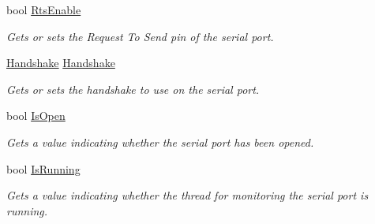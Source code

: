\begin{DoxyCompactItemize}
bool \mbox{\hyperlink{class_r_j_c_p_1_1_i_o_1_1_ports_1_1_native_1_1_win_native_serial_a29a44c81c9193aa7687178a2219cbed1}{Rts\+Enable}}
\begin{DoxyCompactList}\small\item\em Gets or sets the Request To Send pin of the serial port. \end{DoxyCompactList}\item 
\mbox{\hyperlink{namespace_r_j_c_p_1_1_i_o_1_1_ports_a5328e888558ed5726b3fb7b8b692527c}{Handshake}} \mbox{\hyperlink{class_r_j_c_p_1_1_i_o_1_1_ports_1_1_native_1_1_win_native_serial_abdd9c9b2d62c5ef94b975adfdd961dab}{Handshake}}
\begin{DoxyCompactList}\small\item\em Gets or sets the handshake to use on the serial port. \end{DoxyCompactList}\item 
bool \mbox{\hyperlink{class_r_j_c_p_1_1_i_o_1_1_ports_1_1_native_1_1_win_native_serial_a4dfb0aaa0ac8a6591d682133bff22a37}{Is\+Open}}
\begin{DoxyCompactList}\small\item\em Gets a value indicating whether the serial port has been opened. \end{DoxyCompactList}\item 
bool \mbox{\hyperlink{class_r_j_c_p_1_1_i_o_1_1_ports_1_1_native_1_1_win_native_serial_a1a0acd17c0516b73d5b1437631f71aa5}{Is\+Running}}
\begin{DoxyCompactList}\small\item\em Gets a value indicating whether the thread for monitoring the serial port is running. \end{DoxyCompactList}\end{DoxyCompactItemize}
